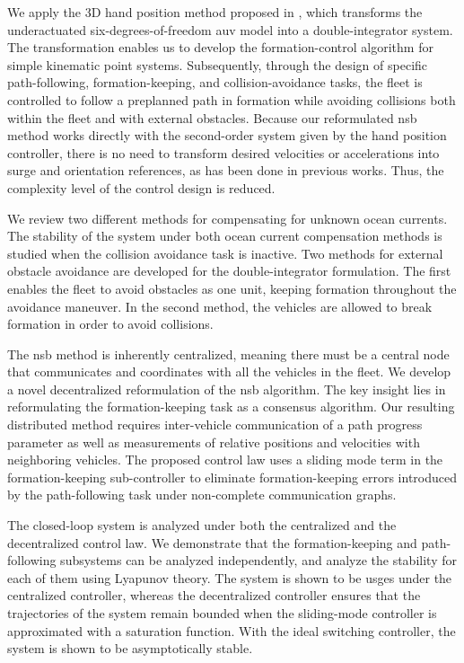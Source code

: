 We apply the 3D hand position method proposed in \cite{matous_trajectory_2023}, which transforms the underactuated six-degrees-of-freedom \gls{auv} model into a double-integrator system. The transformation enables us to develop the formation-control algorithm for simple kinematic point systems. Subsequently, through the design of specific path-following, formation-keeping, and collision-avoidance tasks, the fleet is controlled to follow a preplanned path in formation while avoiding collisions both within the fleet and with external obstacles. Because our reformulated \gls{nsb} method works directly with the second-order system given by the hand position controller, there is no need to transform desired velocities or accelerations into surge and orientation references, as has been done in previous works. Thus, the complexity level of the control design is reduced.

We review two different methods for compensating for unknown ocean currents. The stability of the system under both ocean current compensation methods is studied when the collision avoidance task is inactive. Two methods for external obstacle avoidance are developed for the double-integrator formulation. The first enables the fleet to avoid obstacles as one unit, keeping formation throughout the avoidance maneuver. In the second method, the vehicles are allowed to break formation in order to avoid collisions.

The \gls{nsb} method is inherently centralized, meaning there must be a central node that communicates and coordinates with all the vehicles in the fleet. We develop a novel decentralized reformulation of the \gls{nsb} algorithm. The key insight lies in reformulating the formation-keeping task as a consensus algorithm. Our resulting distributed method requires inter-vehicle communication of a path progress parameter as well as measurements of relative positions and velocities with neighboring vehicles. The proposed control law uses a sliding mode term in the formation-keeping sub-controller to eliminate formation-keeping errors introduced by the path-following task under non-complete communication graphs.

The closed-loop system is analyzed under both the centralized and the decentralized control law. We demonstrate that the formation-keeping and path-following subsystems can be analyzed independently, and analyze the stability for each of them using Lyapunov theory. The system is shown to be \gls{usges} under the centralized controller, whereas the decentralized controller ensures that the trajectories of the system remain bounded when the sliding-mode controller is approximated with a saturation function. With the ideal switching controller, the system is shown to be asymptotically stable.

